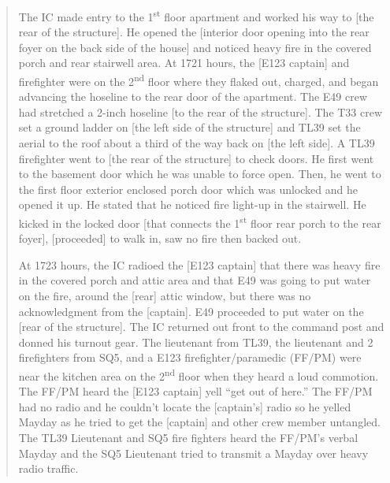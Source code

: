 \documentclass[12pt,oneside]{book}
\begin{document}
\begin{quote}
The IC made entry to the 1\textsuperscript{st} floor apartment and worked his way to [the rear of the structure]. He opened the [interior door opening into the rear foyer on the back side of the house] and noticed heavy fire in the covered porch and rear stairwell area. At 1721 hours, the [E123 captain] and firefighter were on the 2\textsuperscript{nd} floor where they flaked out, charged, and began advancing the hoseline to the rear door of the apartment. The E49 crew had stretched a 2-inch hoseline [to the rear of the structure]. The T33 crew set a ground ladder on [the left side of the structure] and TL39 set the aerial to the roof about a third of the way back on [the left side]. A TL39 firefighter went to [the rear of the structure] to check doors. He first went to the basement door which he was unable to force open. Then, he went to the first floor exterior enclosed porch door which was unlocked and he opened it up. He stated that he noticed fire light-up in the stairwell. He kicked in the locked door [that connects the 1\textsuperscript{st} floor rear porch to the rear foyer], [proceeded] to walk in, saw no fire then backed out.

At 1723 hours, the IC radioed the [E123 captain] that there was heavy fire in the covered porch and attic area and that E49 was going to put water on the fire, around the [rear] attic window, but there was no acknowledgment from the [captain]. E49 proceeded to put water on the [rear of the structure]. The IC returned out front to the command post and donned his turnout gear. The lieutenant from TL39, the lieutenant and 2 firefighters from SQ5, and a E123 firefighter/paramedic (FF/PM) were near the kitchen area on the 2\textsuperscript{nd} floor when they heard a loud commotion. The FF/PM heard the [E123 captain] yell ``get out of here.'' The FF/PM had no radio and he couldn't locate the [captain's] radio so he yelled Mayday as he tried to get the [captain] and other crew member untangled. The TL39 Lieutenant and SQ5 fire fighters heard the FF/PM's verbal Mayday and the SQ5 Lieutenant tried to transmit a Mayday over heavy radio traffic.


\end{quote}
\end{document}
